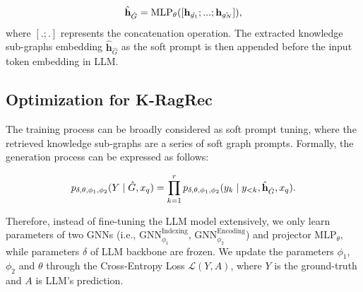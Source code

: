 \begin{equation}
\setlength{\abovedisplayskip}{2pt}
\setlength{\belowdisplayskip}{2pt}
\hat{\textbf{h}}_{\hat{G}}= \text{MLP}_{\theta}([\textbf{h}_{\hat{g_1}};...;\textbf{h}_{\hat{g_N}}]),
\end{equation}
where $[.; .]$ represents the concatenation operation. 
The extracted knowledge sub-graphs embedding $\hat{\textbf{h}}_{\hat{G}}$ as the soft prompt is then appended before the input token embedding in LLM. 


\subsection{Optimization for K-RagRec} 
The training process can be broadly considered as soft prompt tuning, where the retrieved knowledge sub-graphs are a series of soft graph prompts.
Formally, the generation process can be expressed as follows:
\begin{small} 
\begin{equation}
\setlength{\abovedisplayskip}{3pt}
\setlength{\belowdisplayskip}{3pt}
p_{\delta, \theta, \phi_1, \phi_2}(Y \mid \hat{G}, x_q) =
\prod_{k=1}^r p_{\delta, \theta, \phi_1, \phi_2}(y_k \mid y_{<k}, \hat{\textbf{h}}_{\hat{G}}, x_q).
\end{equation}
\end{small}

Therefore, instead of fine-tuning the LLM model extensively, we only learn parameters of two GNNs (i.e., $\text{GNN}_{\phi_1}^{\text{Indexing}}$, $\text{GNN}_{\phi_2}^{\text{Encoding}}$) and projector  $\text{MLP}_\theta$, while parameters $\delta$ of LLM backbone are frozen. We update the parameters $\phi_1$, $\phi_2$ and $\theta$ through the Cross-Entropy Loss $\mathcal{L}(Y,A)$, where $Y$ is the ground-truth and $A$ is LLM's prediction.
